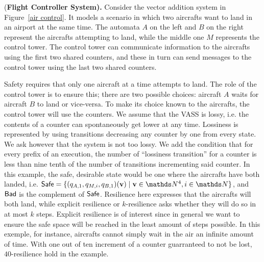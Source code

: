 \begin{example}\label{Example}
{(\bf Flight Controller System).}
Consider the vector addition system in Figure~\ref{air control}. It models a scenario in which two aircrafts want to land in an airport at the same time. 
The automata $A$ on the left and $B$ on the right represent the aircrafts attempting to land, while the middle one $M$ represents the control tower. The control tower can communicate information to the aircrafts using 
the first two shared counters, and these in turn can send messages to the control tower
using the last two shared counters. 

Safety requires that only one aircraft at a time attempts to land. The role of the control tower is to ensure this;
there are two possible choices: aircraft $A$ waits for aircraft $B$ to land
or vice-versa. To make its choice known to the aircrafts, the control tower will use the counters. 
We assume that the VASS is
lossy, i.e. 
 the contents of a counter can spontaneously get lower at any time.
 Lossiness is represented by using transitions decreasing any counter by one from every state. 
We ask however that the system is not too lossy. We add the condition that for every prefix of an execution, the number of ``lossiness transition'' for a counter is less than nine tenth of the number of transitions incrementing said counter.
In this example, the safe, desirable state would be one where the aircrafts have both landed, i.e.
$\Safe = \{(q_{A,1}, q_{M,i}, q_{B,1})(\textbf{v}) \mid \textbf{v} \in \N^4, i \in \N\}$, and $\textsf{Bad}$ is the complement of $\textsf{Safe}$. 
Resilience here expresses that the aircrafts will both land, while explicit resilience or $k$-resilience asks whether they will do so in at most $k$ steps. 
Explicit resilience is of interest since in general we want to ensure the safe space will
be reached in
the least amount of steps possible. 
In this exemple, for instance, aircrafts cannot simply wait in the air an infinite amount of time.
With one out of ten increment of a counter guarranteed to not be lost, $40$-resilience hold in the example.
\end{example}






